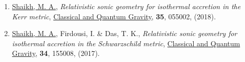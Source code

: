 \begin{enumerate}
\item \underline{Shaikh, M. A.}, {\itshape Relativistic sonic geometry for isothermal accretion in the Kerr metric}, \href{https://doi.org/10.1088%2F1361-6382%2Faaa5cd}{{Classical and Quantum Gravity}}, {\bfseries 35}, 055002, (2018).
\item \underline{Shaikh, M. A.}, Firdousi, I. \& Das, T. K., {\itshape Relativistic sonic geometry for isothermal accretion in the Schwarzschild metric}, \href{https://doi.org/10.1088%2F1361-6382%2Faa7b19}{{Classical and Quantum Gravity}}, {\bfseries 34}, 155008, (2017).
\end{enumerate}